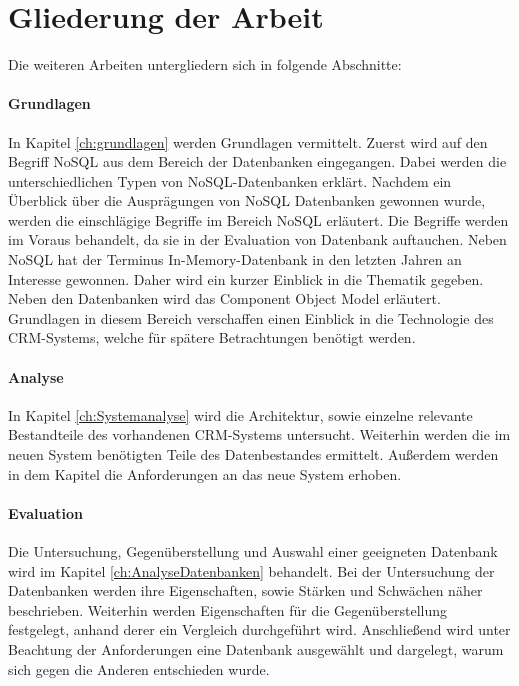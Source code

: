 \section{Gliederung der Arbeit}
\label{ch:Einfuehrung:sec:Gliederung}

Die weiteren Arbeiten untergliedern sich in folgende Abschnitte: 
 
\paragraph{Grundlagen} In Kapitel \ref{ch:grundlagen} werden Grundlagen vermittelt. Zuerst wird auf den Begriff NoSQL aus dem Bereich der Datenbanken eingegangen. Dabei werden die unterschiedlichen Typen von NoSQL-Datenbanken erklärt. Nachdem ein Überblick über die Ausprägungen von NoSQL Datenbanken gewonnen wurde, werden die einschlägige Begriffe im Bereich NoSQL erläutert. Die Begriffe werden im Voraus behandelt, da sie in der Evaluation von Datenbank auftauchen. Neben NoSQL hat der Terminus In-Memory-Datenbank in den letzten Jahren an Interesse gewonnen. Daher wird ein kurzer Einblick in die Thematik gegeben. Neben den Datenbanken wird das Component Object Model erläutert. Grundlagen in diesem Bereich verschaffen einen Einblick in die Technologie des CRM-Systems, welche für spätere Betrachtungen benötigt werden. 

\paragraph{Analyse} In Kapitel \ref{ch:Systemanalyse} wird die Architektur, sowie einzelne relevante Bestandteile des vorhandenen CRM-Systems untersucht. Weiterhin werden die im neuen System benötigten Teile des Datenbestandes ermittelt. Außerdem werden in dem Kapitel die Anforderungen an das neue System erhoben.

\paragraph{Evaluation} Die Untersuchung, Gegenüberstellung und Auswahl einer geeigneten Datenbank wird im Kapitel \ref{ch:AnalyseDatenbanken} behandelt. Bei der Untersuchung der Datenbanken werden ihre Eigenschaften, sowie Stärken und Schwächen näher beschrieben. Weiterhin werden Eigenschaften für die Gegenüberstellung festgelegt, anhand derer ein Vergleich durchgeführt wird. Anschließend wird unter Beachtung der Anforderungen eine Datenbank ausgewählt und dargelegt, warum sich gegen die Anderen entschieden wurde.  

